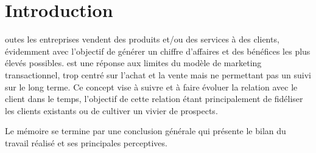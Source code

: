 \chapter*{Introduction}

\begin{onehalfspace}
 outes les entreprises vendent des produits et/ou des services à des clients, évidemment avec l’objectif de générer un chiffre d’affaires et des bénéfices les plus élevés possibles.  est une réponse aux limites du modèle de marketing transactionnel, trop centré sur l’achat et la vente mais ne permettant pas un suivi sur le long terme. Ce concept vise à suivre et à faire évoluer la relation avec le client dans le temps, l’objectif de cette relation étant principalement de fidéliser les clients existants ou de cultiver un vivier de prospects.

\noindent Le mémoire se termine par une conclusion générale qui présente le bilan du travail réalisé et ses principales perceptives.
\clearpage

\end{onehalfspace}